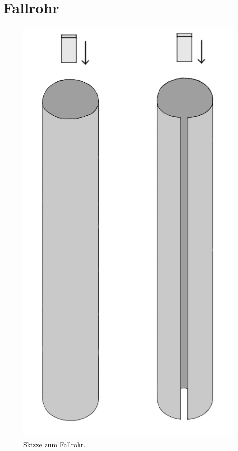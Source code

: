 \documentclass[11pt,a4paper,titlepage, ngerman]{article}
\begin{document}
	\section{Fallrohr}
	\begin{figure}[ht]
		\includegraphics[width=\textwidth]{Neodymmagnet.png}
		\caption{Skizze zum Fallrohr.}
		\label{fig:fallrohr}
	\end{figure}
	
	
\end{document}
